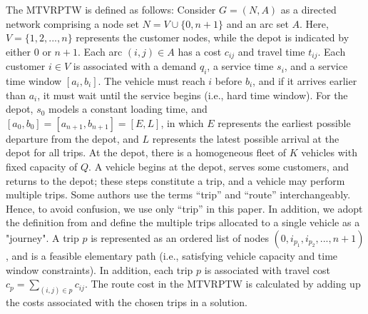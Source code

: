 The MTVRPTW is defined as follows:  Consider $G = (N, A)$ as a directed network comprising a node set $N = V \cup \{0, n + 1\}$ and an arc set $A$.  Here, $V = \{1, 2,..., n\}$ represents the customer nodes, while the depot is indicated by either $0$ or $n + 1$.  Each arc $(i, j) \in A$ has a cost $c_{ij}$ and travel time $t_{ij}$.  Each customer $i \in V$ is associated with a demand $q_i$, a service time $s_i$, and a service time window $[a_i, b_i]$.  The vehicle must reach $i$ before $b_i$, and if it arrives earlier than $a_i$, it must wait until the service begins (i.e., hard time window).  For the depot, $s_0$ models a constant loading time, and $[a_0, b_0] = [a_{n+1}, b_{n+1}] = [E, L]$, in which $E$ represents the earliest possible departure from the depot, and $L$ represents the latest possible arrival at the depot for all trips.  At the depot, there is a homogeneous fleet of $K$ vehicles with fixed capacity of $Q$.  A vehicle begins at the depot, serves some customers, and returns to the depot; these steps constitute a trip, and a vehicle may perform multiple trips.  Some authors use the terms “trip” and “route” interchangeably. Hence, to avoid confusion, we use only “trip” in this paper.  In addition, we adopt the definition from \cite{cattaruzza2016vehicle} and define the multiple trips allocated to a single vehicle as a "journey".  A trip $p$ is represented as an ordered list of nodes $(0, i_{p_1}, i_{p_2}, ..., n + 1)$, and is a feasible elementary path (i.e., satisfying vehicle capacity and time window constraints).  In addition, each trip $p$ is associated with travel cost $c_p = \sum_{(i, j) \in p} c_{ij}$.  The route cost in the MTVRPTW is calculated by adding up the costs associated with the chosen trips in a solution.



